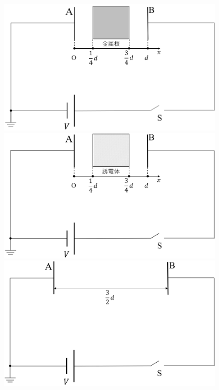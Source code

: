 \begin{figure}[H]
  \centering
  \begin{minipage}{0.3\columnwidth}
    \includegraphics[width=\columnwidth]{../graphs/jumon_108_4.png}
    \caption{}
  \end{minipage}
  \begin{minipage}{0.3\columnwidth}
    \includegraphics[width=\columnwidth]{../graphs/jumon_108_5.png}
    \caption{}
  \end{minipage}
  \begin{minipage}{0.3\columnwidth}
    \includegraphics[width=\columnwidth]{../graphs/jumon_108_6.png}
    \caption{}
  \end{minipage}
\end{figure}

